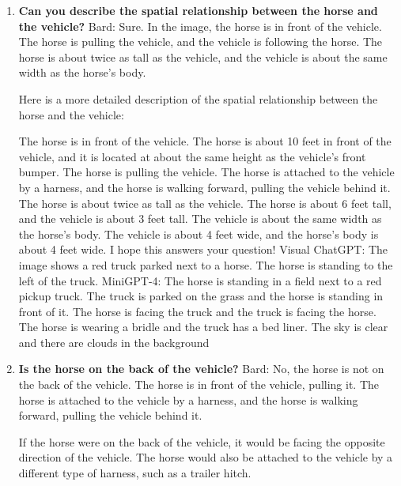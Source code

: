     \begin{enumerate}
        \item \textbf{Can you describe the spatial relationship between the horse and the vehicle?}
        \subitem Bard:
        Sure. In the image, the horse is in front of the vehicle. The horse is pulling the vehicle, and the vehicle is following the horse. The horse is about twice as tall as the vehicle, and the vehicle is about the same width as the horse's body.

        Here is a more detailed description of the spatial relationship between the horse and the vehicle:

        The horse is in front of the vehicle. The horse is about 10 feet in front of the vehicle, and it is located at about the same height as the vehicle's front bumper.
        The horse is pulling the vehicle. The horse is attached to the vehicle by a harness, and the horse is walking forward, pulling the vehicle behind it.
        The horse is about twice as tall as the vehicle. The horse is about 6 feet tall, and the vehicle is about 3 feet tall.
        The vehicle is about the same width as the horse's body. The vehicle is about 4 feet wide, and the horse's body is about 4 feet wide.
        I hope this answers your question!
        \subitem Visual ChatGPT: The image shows a red truck parked next to a horse. The horse is standing to the left of the truck.
        \subitem MiniGPT-4: The horse is standing in a field next to a red pickup truck. The truck is parked on the grass and the horse is standing in front of it. The horse is facing the truck and the truck is facing the horse. The horse is wearing a bridle and the truck has a bed liner. The sky is clear and there are clouds in the background
        \item \textbf{Is the horse on the back of the vehicle?}
        \subitem Bard: 
        No, the horse is not on the back of the vehicle. The horse is in front of the vehicle, pulling it. The horse is attached to the vehicle by a harness, and the horse is walking forward, pulling the vehicle behind it.
        
        If the horse were on the back of the vehicle, it would be facing the opposite direction of the vehicle. The horse would also be attached to the vehicle by a different type of harness, such as a trailer hitch.
        

\end{enumerate}
